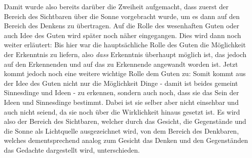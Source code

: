 Damit wurde also bereits darüber die Zweiheit aufgemacht, dass zuerst der Bereich des Sichtbaren über die Sonne vorgebracht wurde, um es dann auf den Bereich des Denkens zu übertragen.  
Auf die Rolle des wesenhaften Guten oder auch Idee des Guten wird später noch näher eingegangen. 
Dies wird dann noch weiter erläutert:
Bis hier war die hauptsächliche Rolle des Guten die Möglichkeit der Erkenntnis zu liefern, also \emph{dass} Erkenntnis überhaupt möglich ist, das jedoch auf den Erkennenden und auf das zu Erkennende angewandt worden ist. Jetzt kommt jedoch noch eine weitere wichtige Rolle dem Guten zu:
Somit kommt aus der Idee des Guten nicht nur die Möglichkeit Dinge - damit ist beides gemeint Sinnesdinge und Ideen - zu erkennen, sondern auch noch, dass sie das Sein der Ideen und Sinnesdinge bestimmt. Dabei ist sie selber aber nicht einsehbar und auch nicht seiend, da sie noch über die Wirklichkeit hinaus gesetzt ist. 
Es wird also der Bereich des Sichtbaren, welcher durch das Gesicht, die Gegenstände und die Sonne als Lichtquelle ausgezeichnet wird, von dem Bereich des Denkbaren, welches dementsprechend analog zum Gesicht das Denken und den Gegenständen das Gedachte dargestellt wird, unterschieden.\\
